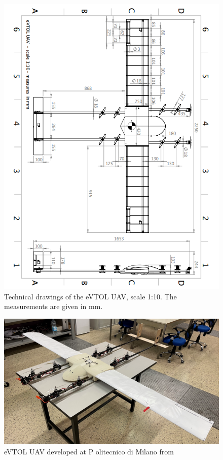 \documentclass{Configuration_Files/PoliMi3i_thesis}
\begin{document}
\begin{figure}
    \centering
    \includegraphics[width=1\linewidth]{Images/Technical drawings of the eVTOL UAV.png}
    \caption{Technical drawings of the eVTOL UAV, scale 1:10. The measurements are given in mm.}
    \label{fig:Technical drawings}
\end{figure}

\begin{figure}
    \centering
    \includegraphics[width=0.75\linewidth]{Images/eVTOL UAV.png}
    \caption{eVTOL UAV developed at P olitecnico di Milano from \cite{battaini2022}}
    \label{fig:eVTOL UAV}
\end{figure}
\end{document}
